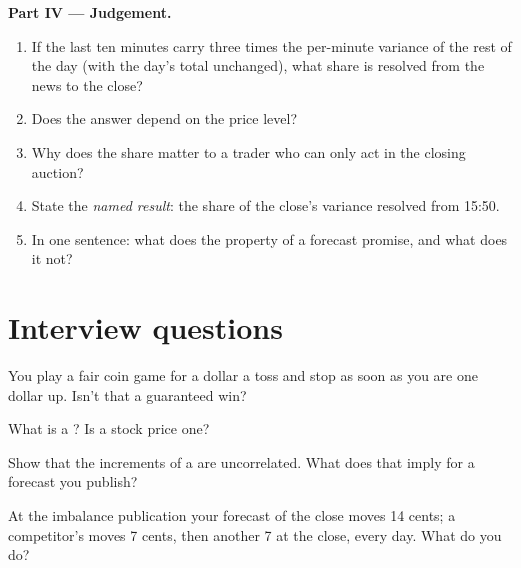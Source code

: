 \begin{problem}
\medskip\noindent\textbf{Part IV --- Judgement.}
\begin{enumerate}[resume]
\item If the last ten minutes carry three times the per-minute variance of the rest of the
day (with the day's total unchanged), what share is resolved from the news to the close?
\item Does the answer depend on the price level?
\item Why does the share matter to a trader who can only act in the closing auction?
\item State the \emph{named result}: the share of the close's variance resolved from 15:50.
\item In one sentence: what does the  property of a forecast promise, and what
does it not?
\end{enumerate}
\end{problem}

\section{Interview questions}

\begin{interviewq}\label{iq:qm:probability-at-speed:1}
You play a fair coin game for a dollar a toss and stop as soon as you are one dollar up.
Isn't that a guaranteed win?
\end{interviewq}

\begin{interviewq}\label{iq:qm:probability-at-speed:2}
What is a ? Is a stock price one?
\end{interviewq}

\begin{interviewq}\label{iq:qm:probability-at-speed:3}
Show that the increments of a  are uncorrelated. What does that imply for a
forecast you publish?
\end{interviewq}

\begin{interviewq}\label{iq:qm:probability-at-speed:4}
At the imbalance publication your forecast of the close moves 14 cents; a competitor's moves
7 cents, then another 7 at the close, every day. What do you do?
\end{interviewq}

